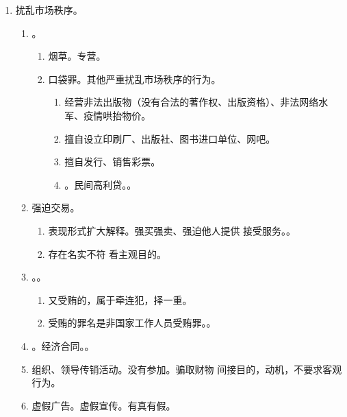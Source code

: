\begin{enumerate}
\begin{enumerate}
          \item 为境外窃取、刺探、收买、非法提供商业秘密。。
          \item 假冒注册商标。新增对服务类商标的保护。。
        \end{enumerate}
  \item 扰乱市场秩序。
        \begin{enumerate}
          \item {}。
                \begin{enumerate}
                  \item 烟草。专营。
                  \item 口袋罪。其他严重扰乱市场秩序的行为。
                        \begin{enumerate}
                          \item 经营非法出版物（没有合法的著作权、出版资格）、非法网络水军、疫情哄抬物价。
                          \item 擅自设立印刷厂、出版社、图书进口单位、网吧。
                          \item 擅自发行、销售彩票。
                          \item {}。\bdy 民间高利贷。。
                        \end{enumerate}
                \end{enumerate}
          \item 强迫交易。
                \begin{enumerate}
                  \item 表现形式扩大解释。强买强卖、强迫他人提供 \hz 接受服务。。
                  \item 存在名实不符 \yjt 看主观目的。
                \end{enumerate}
          \item {}。。
                \begin{enumerate}
                  \item 又受贿的，属于牵连犯，择一重。
                  \item 受贿的罪名是非国家工作人员受贿罪。。
                \end{enumerate}
          \item {}。经济合同。。
          \item 组织、领导传销活动。没有参加。骗取财物 \yjt 间接目的，动机，不要求客观行为。
          \item 虚假广告。\bdy 虚假宣传。有真有假。
        \end{enumerate}
\end{enumerate}
